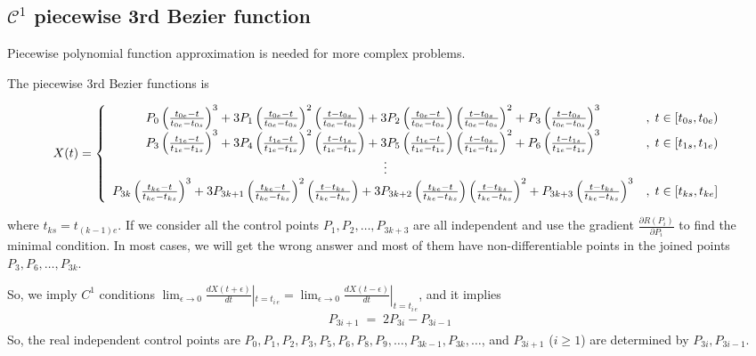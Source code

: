 \documentclass[12pt]{article}
\begin{document}
\subsection{$\mathcal{C}^1$ piecewise 3rd Bezier function}


Piecewise polynomial function approximation is needed for more complex problems.

The piecewise 3rd Bezier functions is 
%
\begin{footnotesize}
	\begin{align*}
		X(t) = \left\{ \begin{array}{c l}
			P_{0} \left( \frac{t_{0e}-t}{t_{0e}-t_{0s}} \right)^3 + 3 P_{1} \left( \frac{t_{0e}-t}{t_{0e}-t_{0s}} \right)^2 \left( \frac{t-t_{0s}}{t_{0e}-t_{0s}} \right) + 3 P_{2} \left( \frac{t_{0e}-t}{t_{0e}-t_{0s}} \right) \left( \frac{t-t_{0s}}{t_{0e}-t_{0s}} \right)^2 + P_{3} \left( \frac{t-t_{0s}}{t_{0e}-t_{0s}} \right)^3 &, \; t\in [t_{0s}, t_{0e}) \\
			P_{3} \left( \frac{t_{1e}-t}{t_{1e}-t_{1s}} \right)^3 + 3 P_{4} \left( \frac{t_{1e}-t}{t_{1e}-t_{1s}} \right)^2 \left( \frac{t-t_{1s}}{t_{1e}-t_{1s}} \right) + 3 P_{5} \left( \frac{t_{1e}-t}{t_{1e}-t_{1s}} \right) \left( \frac{t-t_{0s}}{t_{1e}-t_{1s}} \right)^2 + P_{6} \left( \frac{t-t_{1s}}{t_{1e}-t_{1s}} \right)^3 &, \; t\in [t_{1s}, t_{1e}) \\
			\qquad \vdots \\
			P_{3k} \left( \frac{t_{ke}-t}{t_{ke}-t_{ks}} \right)^3 + 3 P_{3k+1} \left( \frac{t_{ke}-t}{t_{ke}-t_{ks}} \right)^2 \left( \frac{t-t_{ks}}{t_{ke}-t_{ks}} \right) + 3 P_{3k+2} \left( \frac{t_{ke}-t}{t_{ke}-t_{ks}} \right) \left( \frac{t-t_{ks}}{t_{ke}-t_{ks}} \right)^2 + P_{3k+3} \left( \frac{t-t_{ks}}{t_{ke}-t_{ks}} \right)^3 &, \; t\in [t_{ks}, t_{ke}] \\
		\end{array} \right.
	\end{align*}
\end{footnotesize}
%
where $t_{ks}=t_{(k-1)e}$.
If we consider all the control points $P_1,P_2,\dots, P_{3k+3}$ are all independent and use the gradient $\frac{\partial R(P_i)}{\partial P_i}$ to find the minimal condition.
In most cases, we will get the wrong answer and most of them have non-differentiable points in the joined points $P_3, P_6, \dots, P_{3k}$.


So, we imply $C^1$ conditions $\lim_{\epsilon\to 0}\frac{d X(t+\epsilon)}{dt} |_{t=t_{i\,e}} = \lim_{\epsilon\to 0}\frac{d X(t-\epsilon)}{dt} |_{t=t_{i\,e}}$, and it implies
%
\begin{align}
	P_{3i+1} \;=\; 2P_{3i} - P_{3i-1}
\end{align}
%
So, the real independent control points are $P_0,P_1,P_2,P_3,P_5,P_6,P_8,P_9,\dots,P_{3k-1},P_{3k},\dots$, and $P_{3i+1}$ ($i\ge 1$) are determined by $P_{3i}, P_{3i-1}$.
\end{document}
